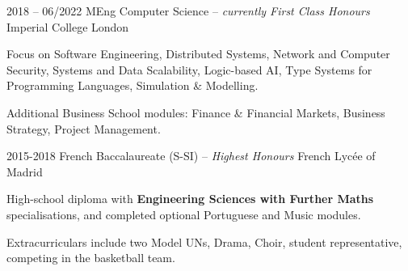 \documentclass[9pt]{developercv}
\newcommand{\para}{\vspace{0.4em}}
\begin{document}
    \begin{entrylist}
        \entry
        {2018 -- 06/2022}
        {MEng Computer Science -- \emph{{\small currently} First Class Honours}}
        {Imperial College London}
        {
            Focus on Software Engineering,
            Distributed Systems,
            Network and Computer Security,
            Systems and Data Scalability,
            Logic-based AI,
            Type Systems for Programming Languages,
            Simulation \& Modelling.

            \para
            Additional Business School modules: Finance \& Financial Markets,
            Business Strategy, Project Management.
        }
        \entry
        {2015-2018}
        {French Baccalaureate (S-SI) --  \emph{Highest Honours}}
        {French Lycée of Madrid}
        {
            High-school diploma with \textbf{Engineering Sciences with Further Maths} specialisations,
            and completed optional Portuguese and Music modules.

            \para
            Extracurriculars include two Model UNs, Drama, Choir, student representative, competing in
        the basketball team.
        }
    \end{entrylist}
\end{document}
